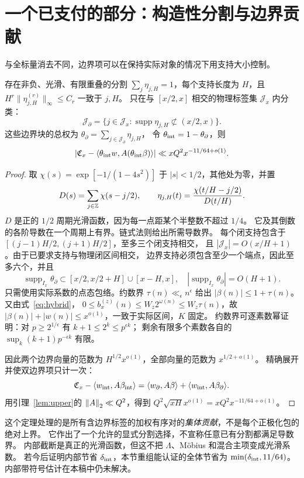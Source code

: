 \section{一个已支付的部分：构造性分割与边界贡献}\label{sec:boundary}
与全标量消去不同，边界项可以在保持实际对象的情况下用支持大小控制\cite{archivephysical}。
\begin{theorem}[实际加权边界的集体上界]\label{thm:boundary}
存在非负、光滑、有限重叠的分割 $\sum_j\eta_{j,H}=1$，每个支持长度为 $H$，且
$H^r\|\eta_{j,H}^{(r)}\|_\infty\le C_r$ 一致于 $j,H$。
只在与 $[x/2,x]$ 相交的物理标签集 $\mathcal J_x$ 内分类：
\[
\mathcal J_\partial=\{j\in\mathcal J_x:\operatorname{supp}\eta_{j,H}\not\subset(x/2,x)\}.
\]
这些边界块的总权为 $\theta_\partial=\sum_{j\in\mathcal J_\partial}\eta_{j,H}$，
令 $\theta_{\rm int}=1-\theta_\partial$，则
\[
\left|\mathfrak C_x-\langle \theta_{\rm int}w,A(\theta_{\rm int}\beta)\rangle\right|
\ll xQ^2x^{-11/64+o(1)}.
\]
\end{theorem}
\begin{proof}
取 $\chi(s)=\exp[-1/(1-4s^2)]$ 于 $|s|<1/2$，其他处为零，并置
\[
D(s)=\sum_{j\in\mathbb Z}\chi(s-j/2),\qquad
\eta_{j,H}(t)=\frac{\chi(t/H-j/2)}{D(t/H)}.
\]
$D$ 是正的 $1/2$ 周期光滑函数，因为每一点距某个半整数不超过 $1/4$。
它及其倒数的各阶导数在一个周期上有界。链式法则给出所需导数界。
每个闭支持包含于 $[(j-1)H/2,(j+1)H/2]$，至多三个闭支持相交，
且 $|\mathcal J_x|=O(x/H+1)$。由于已要求支持与物理闭区间相交，
边界支持必须包含至少一个端点，因此至多六个，并且
\[
\operatorname{supp}_{I_x}\theta_\partial
\subset [x/2,x/2+H]\cup[x-H,x],
\quad |\operatorname{supp}_{I_x}\theta_\partial|=O(H+1).
\]
只需使用实际系数的点态包络。约数界 $\tau(n)\ll_\epsilon n^\epsilon$ 给出
$|\beta(n)|\le1+\tau(n)$。又由式~\eqref{eq:hybrid}，
$0\le b_x^{(z)}(n)\le W_z2^{\omega(n)}\le W_z\tau(n)$，故
$|\beta(n)|+|w(n)|\le x^{o(1)}$，一致于实际区间，$K$ 固定。
约数界可逐素数幂证明：对 $p\ge2^{1/\epsilon}$ 有 $k+1\le2^k\le p^{\epsilon k}$；
剩余有限多个素数各自的 $\sup_k(k+1)p^{-\epsilon k}$ 有限。

因此两个边界向量的范数为 $H^{1/2}x^{o(1)}$，全部向量的范数为 $x^{1/2+o(1)}$。
精确展开并使双边界项只计一次：
\[
\mathfrak C_x-\langle w_{\rm int},A\beta_{\rm int}\rangle
=\langle w_\partial,A\beta\rangle+\langle w_{\rm int},A\beta_\partial\rangle.
\]
用引理~\ref{lem:upper}的 $\left\|A\right\|_2\ll Q^2$，得到
$Q^2\sqrt{xH}x^{o(1)}=xQ^2x^{-11/64+o(1)}$。
\end{proof}
这个定理处理的是所有含边界标签的加权有序对的\emph{集体贡献}，不是每个正极化包的绝对上界。
它作出了一个允许的显式分割选择，不宣称任意已有分割都满足导数界。
内部截断是真正的光滑函数，但这不把 $\Lambda$、Möbius 和混合主项变成光滑系数。
若今后证明内部节省 $\delta_{\rm int}$，本节重组能认证的全体节省为
$\min(\delta_{\rm int},11/64)$。内部带符号估计在本稿中仍未解决。
